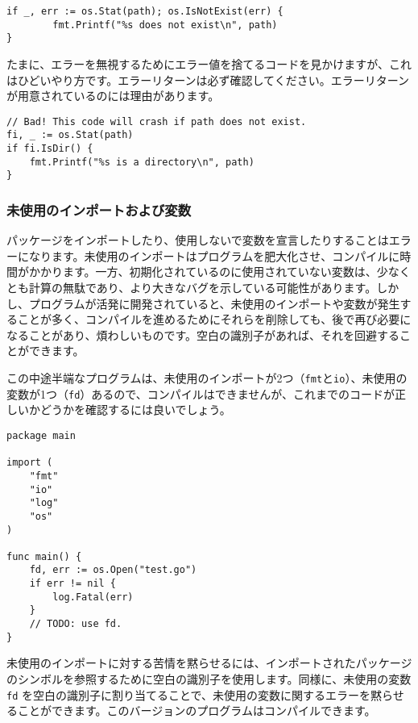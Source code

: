 \documentclass{jsarticle}
\begin{document}
\begin{lstlisting}[numbers=none]
if _, err := os.Stat(path); os.IsNotExist(err) {
        fmt.Printf("%s does not exist\n", path)
}
\end{lstlisting}

たまに、エラーを無視するためにエラー値を捨てるコードを見かけますが、これはひどいやり方です。エラーリターンは必ず確認してください。エラーリターンが用意されているのには理由があります。

\begin{lstlisting}[numbers=none]
// Bad! This code will crash if path does not exist.
fi, _ := os.Stat(path)
if fi.IsDir() {
    fmt.Printf("%s is a directory\n", path)
}
\end{lstlisting}

\subsubsection{未使用のインポートおよび変数}

パッケージをインポートしたり、使用しないで変数を宣言したりすることはエラーになります。未使用のインポートはプログラムを肥大化させ、コンパイルに時間がかかります。一方、初期化されているのに使用されていない変数は、少なくとも計算の無駄であり、より大きなバグを示している可能性があります。しかし、プログラムが活発に開発されていると、未使用のインポートや変数が発生することが多く、コンパイルを進めるためにそれらを削除しても、後で再び必要になることがあり、煩わしいものです。空白の識別子があれば、それを回避することができます。

この中途半端なプログラムは、未使用のインポートが2つ（\texttt{fmt}と\texttt{io}）、未使用の変数が1つ（\texttt{fd}）あるので、コンパイルはできませんが、これまでのコードが正しいかどうかを確認するには良いでしょう。

\begin{lstlisting}[numbers=none]
package main

import (
    "fmt"
    "io"
    "log"
    "os"
)

func main() {
    fd, err := os.Open("test.go")
    if err != nil {
        log.Fatal(err)
    }
    // TODO: use fd.
}
\end{lstlisting}

未使用のインポートに対する苦情を黙らせるには、インポートされたパッケージのシンボルを参照するために空白の識別子を使用します。同様に、未使用の変数
\texttt{fd}
を空白の識別子に割り当てることで、未使用の変数に関するエラーを黙らせることができます。このバージョンのプログラムはコンパイルできます。
\end{document}
